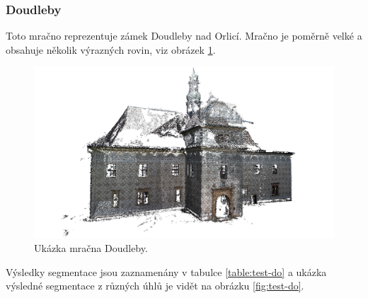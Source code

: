 \documentclass[11pt,twoside,a4paper]{book}
\begin{document}
\cleardoublepage
\subsubsection{Doudleby}

Toto mračno reprezentuje zámek Doudleby nad Orlicí. Mračno je poměrně velké a obsahuje několik výrazných rovin, viz obrázek \ref{fig:doudleby}.

\begin{figure}[H]
\begin{center}
\includegraphics[width=\textwidth]{figures/doudleby}
\caption{Ukázka mračna Doudleby.}
\label{fig:doudleby}
\end{center}
\end{figure}

Výsledky segmentace jsou zaznamenány v tabulce \ref{table:test-do} a ukázka výsledné segmentace z různých úhlů je vidět na obrázku \ref{fig:test-do}.
\end{document}

